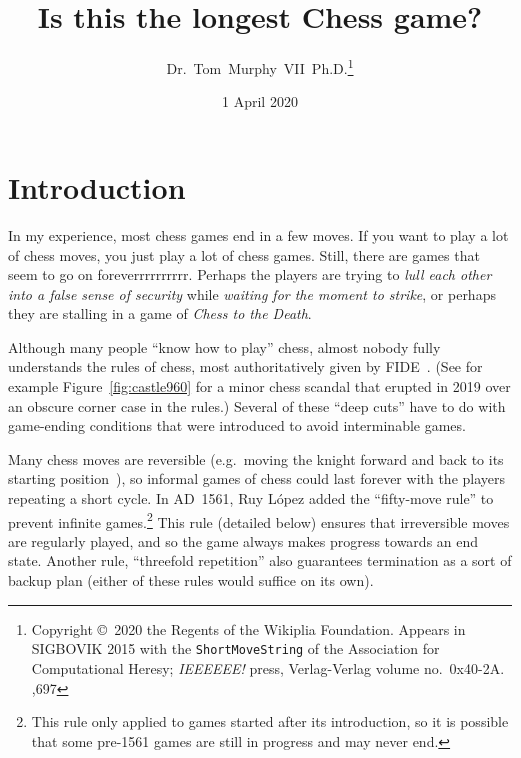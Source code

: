\documentclass[twocolumn]{article}
\begin{document}
 

\title{Is this the longest Chess game?}
\author{Dr.~Tom~Murphy~VII~Ph.D.\thanks{
Copyright \copyright\ 2020 the Regents of the Wikiplia
Foundation. Appears in SIGBOVIK 2015 with the {\tt ShortMoveString} of the
Association for Computational Heresy; {\em IEEEEEE!} press,
Verlag-Verlag volume no.~0x40-2A.
,697
}
}

\renewcommand\>{$>$}
\newcommand\<{$<$}

\date{1 April 2020}

\maketitle

\section{Introduction}

In my experience, most chess games end in a few moves. If you want to
play a lot of chess moves, you just play a lot of chess games. Still,
there are games that seem to go on foreverrrrrrrrrr. Perhaps the
players are trying to {\em lull each other into a false sense of
security} while {\em waiting for the moment to strike}, or perhaps they
are stalling in a game of {\em Chess to the Death}.

Although many people ``know how to play'' chess, almost nobody fully
understands the rules of chess, most authoritatively given by
FIDE~\cite{fiderules}. (See for example Figure~\ref{fig:castle960} for
a minor chess scandal that erupted in 2019 over an obscure corner case
in the rules.) Several of these ``deep cuts'' have to do with
game-ending conditions that were introduced to avoid interminable
games.

Many chess moves are reversible (e.g.~moving the knight forward and
back to its starting position~\cite{survival}), so informal games of
chess could last forever with the players repeating a short cycle. In
AD~1561, Ruy L\'opez added the ``fifty-move rule'' to prevent infinite
games.\footnote{This rule only applied to games started after its
  introduction, so it is possible that some pre-1561 games are still
  in progress and may never end.} This rule (detailed below) ensures
that irreversible moves are regularly played, and so the game always
makes progress towards an end state. Another rule, ``threefold
repetition'' also guarantees termination as a sort of backup plan
(either of these rules would suffice on its own).
\end{document}
